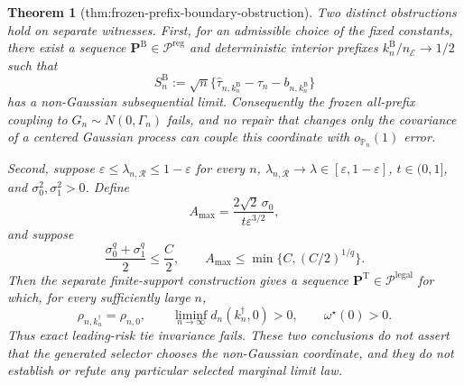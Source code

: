 \documentclass{article}
\newtheorem{theorem}{Theorem}
\begin{document}
\begin{theorem}[thm:frozen-prefix-boundary-obstruction]\label{thm:frozen-prefix-boundary-obstruction}
Two distinct obstructions hold on separate witnesses.  First, for an admissible choice of the fixed constants, there exist a sequence \(\mathbf P^{\mathrm B}\in\mathcal P^{\mathrm{reg}}\) and deterministic interior prefixes \(k_n^{\mathrm B}/n_{\mathcal E}\to1/2\) such that
\[
 S_n^{\mathrm B}:=
 \sqrt n\{\widehat\tau_{n,k_n^{\mathrm B}}-\tau_n-b_{n,k_n^{\mathrm B}}\}
\]
has a non-Gaussian subsequential limit.  Consequently the frozen all-prefix coupling to \(G_n\sim N(0,\Gamma_n)\) fails, and no repair that changes only the covariance of a centered Gaussian process can couple this coordinate with \(o_{\mathbb P_n}(1)\) error.

Second, suppose \(\varepsilon\leq\lambda_{n,\mathcal R}\leq1-\varepsilon\) for every \(n\), \(\lambda_{n,\mathcal R}\to\lambda\in[\varepsilon,1-\varepsilon]\), \(t\in(0,1]\), and \(\sigma_0^2,\sigma_1^2>0\).  Define
\[
 A_{\max}=\frac{2\sqrt2\,\sigma_0}{t\varepsilon^{3/2}},
\]
and suppose
\[
 \frac{\sigma_0^q+\sigma_1^q}{2}\leq\frac C2,
 \qquad
 A_{\max}\leq\min\{C,(C/2)^{1/q}\}.
\]
Then the separate finite-support construction gives a sequence \(\mathbf P^{\mathrm T}\in\mathcal P^{\mathrm{legal}}\) for which, for every sufficiently large \(n\),
\[
 \rho_{n,k_n^{\dagger}}=\rho_{n,0},
 \qquad
 \liminf_{n\to\infty}d_n(k_n^{\dagger},0)>0,
 \qquad
 \omega^{\star}(0)>0.
\]
Thus exact leading-risk tie invariance fails.  These two conclusions do not assert that the generated selector chooses the non-Gaussian coordinate, and they do not establish or refute any particular selected marginal limit law.
\end{theorem}
\end{document}
